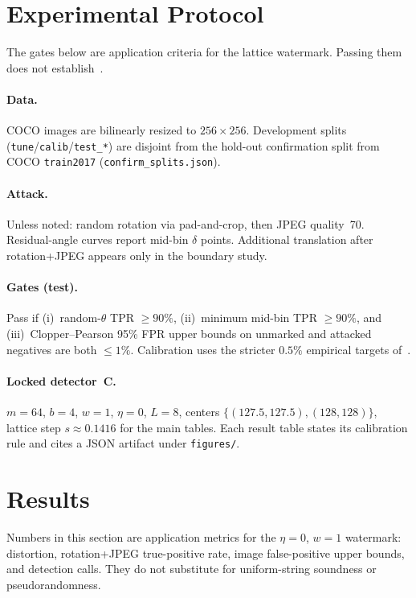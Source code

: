 \documentclass[11pt,a4paper]{article}
\begin{document}



\section{Experimental Protocol}
\label{sec:protocol}

The gates below are application criteria for the lattice watermark.
Passing them does not establish~.

\paragraph{Data.}
COCO images are bilinearly resized to \(256\times256\).
Development splits (\texttt{tune}/\texttt{calib}/\texttt{test\_*}) are disjoint from
the hold-out confirmation split from COCO \texttt{train2017}
(\texttt{confirm\_splits.json}).

\paragraph{Attack.}
Unless noted: random rotation via pad-and-crop, then JPEG quality~70.
Residual-angle curves report mid-bin \(\delta\) points.
Additional translation after rotation+JPEG appears only in the boundary study.

\paragraph{Gates (test).}
Pass if (i)~random-\(\theta\) TPR \(\ge 90\%\),
(ii)~minimum mid-bin TPR \(\ge 90\%\), and
(iii)~Clopper--Pearson 95\% FPR upper bounds on unmarked and attacked negatives are
both \(\le 1\%\).
Calibration uses the stricter \(0.5\%\) empirical targets of~.

\paragraph{Locked detector~C.}
\(m=64\), \(b=4\), \(w=1\), \(\eta=0\), \(L=8\), centers
\(\{(127.5,127.5),(128,128)\}\), lattice step \(s\approx 0.1416\) for the main
tables.
Each result table states its calibration rule and cites a JSON artifact under
\texttt{figures/}.

\section{Results}
\label{sec:experiments}

Numbers in this section are application metrics for the \(\eta=0\), \(w=1\)
watermark: distortion, rotation+JPEG true-positive rate, image false-positive upper
bounds, and detection calls.
They do not substitute for uniform-string soundness or pseudorandomness.
\end{document}
